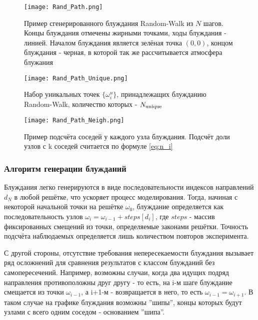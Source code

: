 \begin{figure}[h]
    
\begin{minipage}{0.49\textwidth}
    \texttt{[image: Rand\_Path.png]}
    \caption{Пример сгенерированного блуждания Random-Walk из $N$ шагов. Концы блуждания отмечены жирными точками, ходы блуждания - линией. Началом блуждания является зелёная точка $(0,0)$, концом блуждания - черная, в которой так же рассчитывается атмосфера блужания}
    \label{fig:path_1}
\end{minipage}
\hfill
\begin{minipage}{0.49\textwidth}
    \texttt{[image: Rand\_Path\_Unique.png]}
    \caption{Набор уникальных точек $\{\omega^u_i\}$, принадлежащих блужданию Random-Walk, количество которых - $N_{\textup{unique}}$}
    \label{fig:path_2}
\end{minipage}
\centering
\texttt{[image: Rand\_Path\_Neigh.png]}
\caption{Пример подсчёта соседей у каждого узла блуждания. Подсчёт доли узлов с k соседей считается по формуле \eqref{eq:n_i}}
\label{fig:path_3}
\end{figure}

\subsubsection{Алгоритм генерации блужданий}

Блуждания легко генерируются в виде последовательности индексов направлений $ {d_{N}} $ в любой решётке, что ускоряет процесс моделирования. 
Тогда, начиная с некоторой начальной точки на решётке $\omega_{0}$, блуждание определяется как последовательность узлов $ 
\omega_{i} = \omega_{i-1} + steps\left[d_{i}\right] $, где $steps$ - массив фиксированных смещений из точки, определяемые законами решётки. 
Точность подсчёта наблюдаемых определяется лишь количеством повторов эксперимента.

С другой стороны, отсутствие требования непересекаемости блуждания вызывает ряд осложнений для сравнения результатов с классом блужданий без самопересечений. 
Например, возможны случаи, когда два идущих подряд направления противоположны друг другу - то есть, на i-м шаге блуждание смещается из точки $\omega_{i-1}$, а i+1-м - возвращается в него, то есть $\omega_{i-1} = \omega_{i+1}$.
В таком случае на графике блуждания возможны ''шипы'', концы которых будут узлами с всего одним соседом - основанием ''шипа''. 



